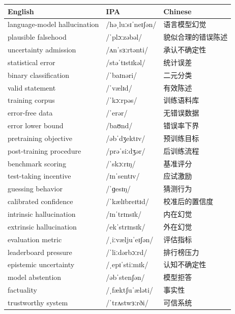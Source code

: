 \documentclass[UTF8,12pt,a4paper]{ctexart}
\providecommand{\zh}[1]{#1}
\begin{document}
\begin{tabular*}{\textwidth}{@{\extracolsep{\fill}}lll@{}}
\toprule
\textbf{English} & \textbf{IPA} & \textbf{Chinese} \\
\midrule
language-model hallucination & {\ipafont /həˌluːsɪˈneɪʃən/} & \zh{语言模型幻觉} \\
plausible falsehood & {\ipafont /ˈplɔːzəbəl/} & \zh{貌似合理的错误陈述} \\
uncertainty admission & {\ipafont /ʌnˈsɜːrtənti/} & \zh{承认不确定性} \\
statistical error & {\ipafont /stəˈtɪstɪkəl/} & \zh{统计误差} \\
binary classification & {\ipafont /ˈbaɪnəri/} & \zh{二元分类} \\
valid statement & {\ipafont /ˈvælɪd/} & \zh{有效陈述} \\
training corpus & {\ipafont /ˈkɔːrpəs/} & \zh{训练语料库} \\
error-free data & {\ipafont /ˈerər/} & \zh{无错误数据} \\
error lower bound & {\ipafont /baʊnd/} & \zh{错误率下界} \\
pretraining objective & {\ipafont /əbˈdʒektɪv/} & \zh{预训练目标} \\
post-training procedure & {\ipafont /prəˈsiːdʒər/} & \zh{后训练流程} \\
benchmark scoring & {\ipafont /ˈskɔːrɪŋ/} & \zh{基准评分} \\
test-taking incentive & {\ipafont /ɪnˈsentɪv/} & \zh{应试激励} \\
guessing behavior & {\ipafont /ˈɡesɪŋ/} & \zh{猜测行为} \\
calibrated confidence & {\ipafont /ˈkælɪbreɪtɪd/} & \zh{校准后的置信度} \\
intrinsic hallucination & {\ipafont /ɪnˈtrɪnsɪk/} & \zh{内在幻觉} \\
extrinsic hallucination & {\ipafont /ekˈstrɪnsɪk/} & \zh{外在幻觉} \\
evaluation metric & {\ipafont /ˌiːvæljuˈeɪʃən/} & \zh{评估指标} \\
leaderboard pressure & {\ipafont /ˈliːdərbɔːrd/} & \zh{排行榜压力} \\
epistemic uncertainty & {\ipafont /ˌepɪˈstiːmɪk/} & \zh{认知不确定性} \\
model abstention & {\ipafont /əbˈstenʃən/} & \zh{模型拒答} \\
factuality & {\ipafont /ˌfæktʃuˈæləti/} & \zh{事实性} \\
trustworthy system & {\ipafont /ˈtrʌstwɜːrði/} & \zh{可信系统} \\

\end{tabular*}
\end{document}

